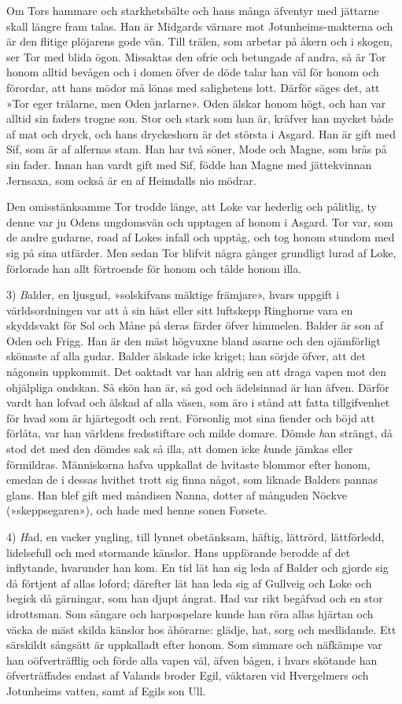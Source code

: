 Om Tors hammare och starkhetsbälte och hans många äfventyr med jättarne
skall längre fram talas. Han är Midgards värnare mot Jotunheims-makterna
och är den flitige plöjarens gode vän. Till trälen, som arbetar på åkern
och i skogen, ser Tor med blida ögon. Missaktas den ofrie och betungade
af andra, så är Tor honom alltid bevågen och i domen öfver de döde talar
han väl för honom och förordar, att hans mödor må lönas med salighetens
lott. Därför säges det, att »Tor eger trälarne, men Oden jarlarne». Oden
älskar honom högt, och han var alltid sin faders trogne son. Stor och
stark som han är, kräfver han mycket både af mat och dryck, och hans
dryckeshorn är det största i Asgard. Han är gift med Sif, som är af
alfernas stam. Han har två söner, Mode och Magne, som brås på sin fader.
Innan han vardt gift med Sif, födde han Magne med jättekvinnan Jernsaxa,
som också är en af Heimdalls nio mödrar.

Den omisstänksamme Tor trodde länge, att Loke var hederlig och pålitlig,
ty denne var ju Odens ungdomsvän och upptagen af honom i Asgard. Tor
var, som de andre gudarne, road af Lokes infall och upptåg, och tog
honom stundom med sig på sina utfärder. Men sedan Tor blifvit några
gånger
grundligt lurad af Loke, förlorade han allt förtroende för honom och
tålde honom illa.

3) {\emph Balder}, en ljusgud, »solskifvans mäktige främjare», hvars
uppgift i världsordningen var att å sin häst eller sitt luftskepp
Ringhorne vara en skyddsvakt för Sol och Måne på deras färder öfver
himmelen. Balder är son af Oden och Frigg. Han är den mäst högvuxne
bland asarne och den ojämförligt skönaste af alla gudar. Balder älskade
icke kriget; han sörjde öfver, att det någonsin uppkommit. Det oaktadt
var han aldrig sen att draga vapen mot den ohjälpliga ondskan. Så skön
han är, så god och ädelsinnad är han äfven. Därför vardt han lofvad och
älskad af alla väsen, som äro i stånd att fatta tillgifvenhet för hvad
som är hjärtegodt och rent. Försonlig mot sina fiender och böjd att
förlåta, var han världens fredsstiftare och milde domare. Dömde
{\emph han} strängt, då stod det med den dömdes sak så illa, att domen
icke {\emph kunde} jämkas eller förmildras. Människorna hafva uppkallat
de hvitaste blommor efter honom, emedan de i dessas hvithet trott sig
finna något, som liknade Balders pannas glans. Han blef gift med
måndisen Nanna, dotter af månguden Nöckve (»skeppsegaren»), och hade med
henne sonen Forsete.

4) {\emph Had}, en vacker yngling, till lynnet obetänksam, häftig,
lättrörd, lättförledd, lidelsefull och med stormande känslor. Hans
uppförande berodde af det inflytande, hvarunder han kom. En tid lät han
sig leda af Balder och gjorde sig då förtjent af allas loford; därefter
lät han leda sig af Gullveig och Loke och begick då gärningar, som han
djupt ångrat. Had var rikt begåfvad och en stor idrottsman. Som sångare
och harpospelare kunde han röra allas hjärtan och väcka de mäst skilda
känslor hos åhörarne: glädje, hat, sorg och medlidande. Ett särskildt
sångsätt är uppkalladt efter honom. Som simmare och näfkämpe var han
oöfverträfflig och förde alla vapen väl, äfven bågen, i hvars skötande
han öfverträffades endast af Valands broder Egil, väktaren vid
Hvergelmers och Jotunheims vatten, samt af Egils son Ull.

